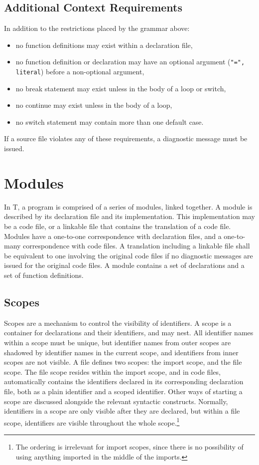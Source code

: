 \documentclass[letterpaper,12pt]{book}
\begin{document}
\section{Additional Context Requirements}

In addition to the restrictions placed by the grammar above:
\begin{itemize}
	\item no function definitions may exist within a declaration file,
	\item no function definition or declaration may have an optional argument (\texttt{"=", literal}) before a non-optional argument,
	\item no break statement may exist unless in the body of a loop or switch,
	\item no continue may exist unless in the body of a loop,
	\item no switch statement may contain more than one default case.
\end{itemize}

If a source file violates any of these requirements, a diagnostic message must be issued.

\chapter{Modules}

In T, a program is comprised of a series of modules, linked together. A module is described by its declaration file and its implementation. This implementation may be a code file, or a linkable file that contains the translation of a code file. Modules have a one-to-one correspondence with declaration files, and a one-to-many correspondence with code files. A translation including a linkable file shall be equivalent to one involving the original code files if no diagnostic messages are issued for the original code files. A module contains a set of declarations and a set of function definitions.

\section{Scopes}

Scopes are a mechanism to control the visibility of identifiers. A scope is a container for declarations and their identifiers, and may nest. All identifier names within a scope must be unique, but identifier names from outer scopes are shadowed by identifier names in the current scope, and identifiers from inner scopes are not visible. A file defines two scopes: the import scope, and the file scope. The file scope resides within the import scope, and in code files, automatically contains the identifiers declared in its corresponding declaration file, both as a plain identifier and a scoped identifier. Other ways of starting a scope are discussed alongside the relevant syntactic constructs. Normally, identifiers in a scope are only visible after they are declared, but within a file scope, identifiers are visible throughout the whole scope.\footnote{The ordering is irrelevant for import scopes, since there is no possibility of using anything imported in the middle of the imports.}
\end{document}
